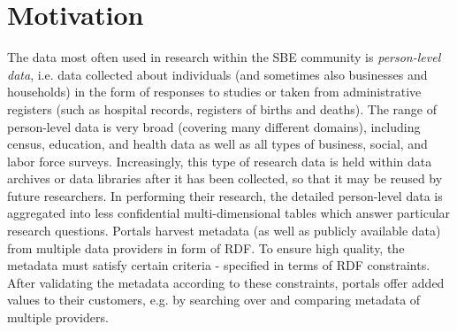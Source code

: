 \documentclass{llncs}
\begin{document}
\section{Motivation}

The data most often used in research within the SBE community is \emph{person-level data}, i.e. data collected about individuals 
(and sometimes also businesses and households) in the form of responses to studies or taken from administrative registers
(such as hospital records, registers of births and deaths). 
The range of person-level data is very broad (covering many different domains), 
including census, education, and health data as well as all types of business, social, and labor force surveys.  
Increasingly, this type of research data is
held within data archives or data libraries after it has been collected, so that it may be
reused by future researchers. 
In performing their research, the detailed person-level
data is aggregated into less confidential multi-dimensional tables which answer particular research questions.
Portals harvest metadata (as well as publicly available data) from multiple data providers in form of RDF.
To ensure high quality, the metadata must satisfy certain criteria - specified in terms of RDF constraints.  
After validating the metadata according to these constraints, portals offer added values to their customers, e.g. by searching over and comparing metadata of multiple providers. 
\end{document}
